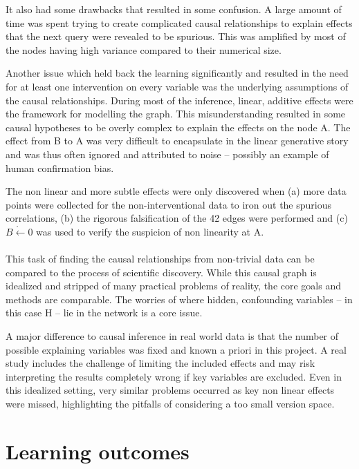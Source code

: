 \documentclass[12pt,fleqn,]{article}
\begin{document}
\begin{multicols}{2}
It also had some drawbacks that resulted in some confusion. A large amount of time was spent trying to create complicated causal relationships to explain effects that the next query were revealed to be spurious. This was amplified by most of the nodes having high variance compared to their numerical size.

Another issue which held back the learning significantly and resulted in the need for at least one intervention on every variable was the underlying assumptions of the causal relationships. During most of the inference, linear, additive effects were the framework for modelling the graph. This misunderstanding resulted in some causal hypotheses to be overly complex to explain the effects on the node A. The effect from B to A was very difficult to encapsulate in the linear generative story and was thus often ignored and attributed to noise -- possibly an example of human confirmation bias. 

The non linear and more subtle effects were only discovered when (a) more data points were collected for the non-interventional data to iron out the spurious correlations, (b) the rigorous falsification of the 42 edges were performed and (c) \(\mathring{B\leftarrow0}\) was used to verify the suspicion of non linearity at A.
\\
\\
This task of finding the causal relationships from non-trivial data can be compared to the process of scientific discovery. While this causal graph is idealized and stripped of many practical problems of reality, the core goals and methods are comparable. The worries of where hidden, confounding variables -- in this case H -- lie in the network is a core issue.

A major difference to causal inference in real world data is that the number of possible explaining variables was fixed and known a priori in this project. A real study includes the challenge of limiting the included effects and may risk interpreting the results completely wrong if key variables are excluded. Even in this idealized setting, very similar problems occurred as key non linear effects were missed, highlighting the pitfalls of considering a too small version space. %

\section{Learning outcomes} 
	
\end{multicols}
\end{document}
